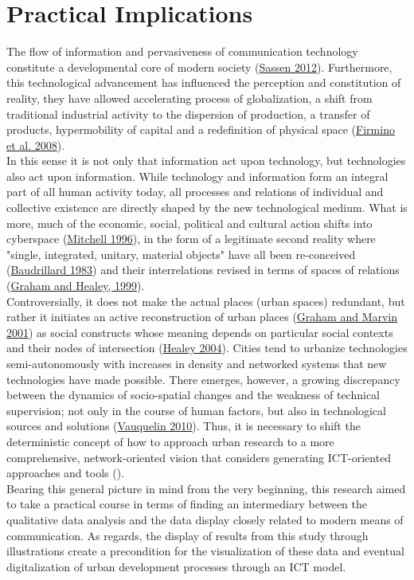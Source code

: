 \documentclass[11pt]{report}
\begin{document}
{\section{Practical Implications}

The flow of information and pervasiveness of communication technology constitute a developmental core of modern society (\href{}{Sassen 2012}).
Furthermore, this technological advancement has influenced the perception and constitution of reality, they have allowed accelerating process of globalization, a shift from traditional industrial activity to the dispersion of production, a transfer of products, hypermobility of capital and a redefinition of physical space (\href{}{Firmino et al. 2008}). 
\\
In this sense it is not only that information act upon technology, but technologies also act upon information.
While technology and information form an integral part of all human activity today, all processes and relations of individual and collective existence are directly shaped by the new technological medium.
What is more, much of the economic, social, political and cultural action shifts into cyberspace (\href{}{Mitchell 1996}), in the form of a legitimate second reality where "single, integrated, unitary, material objects" have all been re-conceived (\href{}{Baudrillard 1983})  and their interrelations revised in terms of spaces of relations (\href{}{Graham and Healey, 1999}).
\\
Controversially, it does not make the actual places (urban spaces) redundant, but rather it initiates an active reconstruction of urban places (\href{}{Graham and Marvin 2001}) as social constructs whose meaning depends on particular social contexts and their nodes of intersection (\href{}{Healey 2004}). 
Cities tend to urbanize technologies semi-autonomously with increases in density and networked systems that new technologies have made possible.
There emerges, however, a growing discrepancy between the dynamics of socio-spatial changes and the weakness of technical supervision; not only in the course of human factors, but also in technological sources and solutions (\href{}{Vauquelin 2010}).
Thus, it is necessary to shift the deterministic concept of how to approach urban research to a more comprehensive, network-oriented vision that considers generating ICT-oriented approaches and tools (\cite{Huang 2012}).
\\
Bearing this general picture in mind from the very beginning, this research aimed to take a practical course in terms of finding an intermediary between the qualitative data analysis and the data display closely related to modern means of communication.
As regards, the display of results from this study through illustrations create a precondition for the visualization of these data and eventual digitalization of urban development processes through an ICT model.

}
\end{document}

